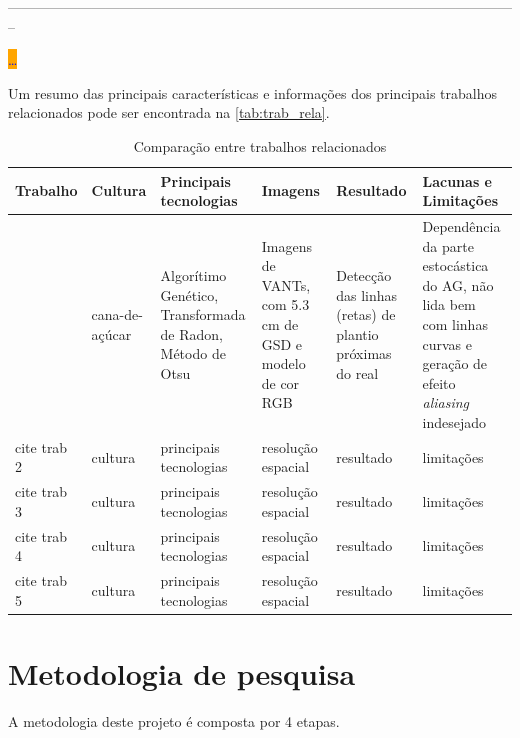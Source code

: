\documentclass[12pt, a4paper, english, brazil]{article}
\newcommand{\textRed}[1]{{{\color{red} #1}}}
\newcommand{\dotsBlue}{\colorbox{orange}{\textcolor{blue}{\dots}}}
\newcommand{\linePage}{--------------------------------------------------------------------------------------------------------------}
\begin{document}
\linePage

\dotsBlue

Um resumo das principais características e informações dos \textRed{principais} trabalhos relacionados pode ser encontrada na \autoref{tab:trab_rela}.

\begin{landscape}
\begin{table}
\centering
\caption{Comparação entre trabalhos relacionados}
\label{tab:trab_rela}
\begin{tabularx}{\linewidth}{|L|L|L|L|L|L|} 
\hline
\textbf{Trabalho} & \textbf{Cultura} & \textbf{Principais tecnologias} & \textbf{Imagens} & \textbf{Resultado} & \textbf{Lacunas e Limitações} \\ \hline
\cite{Silva_Escarpinati_Backes_2021} & cana-de-açúcar & Algorítimo Genético, Transformada de Radon, Método de Otsu & Imagens de VANTs, com 5.3 cm de GSD e modelo de cor RGB & Detecção das linhas (retas) de plantio próximas do real & Dependência da parte estocástica do AG, não lida bem com linhas curvas e geração de efeito \textit{aliasing} indesejado \\ \hline
cite trab 2 & cultura & principais tecnologias & resolução espacial & resultado & limitações \\ \hline
cite trab 3 & cultura & principais tecnologias & resolução espacial & resultado & limitações \\ \hline
cite trab 4 & cultura & principais tecnologias & resolução espacial & resultado & limitações \\ \hline
cite trab 5 & cultura & principais tecnologias & resolução espacial & resultado & limitações \\ \hline
\end{tabularx}
\end{table}
\end{landscape}

\section{Metodologia de pesquisa}
A metodologia deste projeto é composta por 4 etapas.
\end{document}
